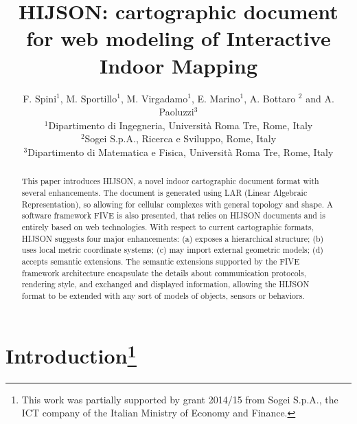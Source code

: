 \documentclass[]{egpubl}
\title[HIJSON: interactive indoor mapping]{HIJSON: cartographic document for web modeling 
of Interactive Indoor Mapping}
\author[F. Spini, M. Sportillo, M. Virgadamo, E. Marino, A. Bottaro, \& A. Paoluzzi]
        {F. Spini$^{1}$, M. Sportillo$^{1}$, M. Virgadamo$^{1}$, E. Marino$^{1}$, A. Bottaro $^{2}$ and A. Paoluzzi$^{3}$
         \\
          $^1$Dipartimento di Ingegneria, Universit\`a Roma Tre, Rome, Italy \\
          $^2$Sogei S.p.A., Ricerca e Sviluppo, Rome, Italy \\
          $^3$Dipartimento di Matematica e Fisica, Universit\`a Roma Tre, Rome, Italy 
        }
\begin{document}

\maketitle

\begin{abstract} This paper introduces HIJSON, a novel indoor cartographic document
format with several enhancements. The document is generated using LAR (Linear Algebraic Representation), so allowing for cellular complexes with general topology and shape. 
A software framework FIVE is also presented, that relies on HIJSON
documents and is entirely based on web technologies. With respect to current
cartographic formats, HIJSON suggests four major enhancements: (a) exposes a
hierarchical structure; (b) uses local metric coordinate systems; (c) may
import external geometric models; (d) accepts semantic extensions. The
semantic extensions supported by the FIVE framework architecture encapsulate
the details about communication protocols, rendering style, and exchanged and
displayed information, allowing the HIJSON format to be extended with any sort
of models of objects, sensors or behaviors. 
\end{abstract}




\section{Introduction\footnote{This work was partially supported by grant 2014/15 from Sogei S.p.A., the ICT company of the Italian Ministry of Economy and Finance.}}
\end{document}
